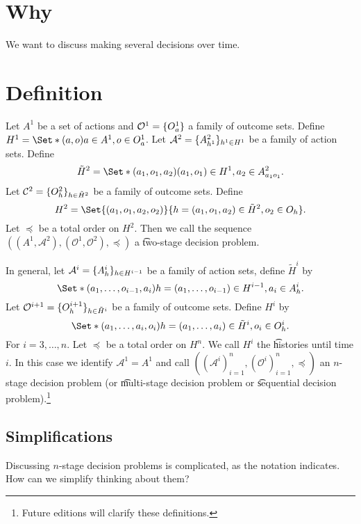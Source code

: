 

\section*{Why}

We want to discuss making several decisions over time.

\section*{Definition}

Let $A^{1}$ be a set of actions and $\mathcal{O}^1 = \{O^{1}_a\}$ a family of outcome sets.
Define $H^1 = \Set*{(a, o)}{a \in A^1, o \in O^{1}_a}$.
Let $\mathcal{A} ^2 = \{A^{2}_{h^1}\}_{h^1 \in H^1}$ be a family of action sets.
Define
    \[
\tilde{H}^{2} = \Set*{(a_1, o_1, a_2)}{(a_1, o_1) \in H^1, a_2 \in A^{2}_{a_1o_1}}.
    \]
Let $\mathcal{C}^2 = \{O^{2}_{h}\}_{h \in \tilde{H}^2}$ be a family of outcome sets.
Define
    \[
H^2 = \Set{(a_1, o_1, a_2, o_2)}{h = (a_1, o_1, a_2) \in \tilde{H}^2, o_2 \in O_{h}}.
    \]
Let $\preceq$ be a total order on $H^2$.
Then we call the sequence $((A^1, \mathcal{A} ^2), (\mathcal{O}^1, \mathcal{O}^2), \preceq)$ a \t{two-stage decision problem}.

In general, let $\mathcal{A} ^{i} = \{A^i_{h}\}_{h \in H^{i-1}}$ be a family of action sets, define $\tilde{H}^i$ by
    \[
\Set*{(a_1, \dots , o_{i-1}, a_i)}{h = (a_1, \dots , o_{i-1}) \in H^{i-1}, a_i \in A^i_{h}}.
    \]
Let $\mathcal{O}^{i+1} = \{O^{i+1}_{h}\}_{h \in \tilde{H}^{i}}$ be a family of outcome sets. Define $H^{i}$ by
    \[
\Set*{(a_1, \dots , a_i, o_i)}{h = (a_1, \dots , a_i) \in \tilde{H}^{i}, o_i \in O^i_{h}}.
    \]
For $i = 3, \dots , n$.
Let $\preceq$ be a total order on $H^{n}$.
We call $H^i$ the \t{histories until time $i$}.
In this case we identify $\mathcal{A} ^1 = A^1$ and call $((\mathcal{A} ^i)_{i = 1}^{n}, (\mathcal{O}^i)_{i = 1}^{n}, \preceq)$ an \t{$n$-stage decision problem} (or \t{multi-stage decision problem} or \t{sequential decision problem}).\footnote{Future editions will clarify these definitions.}

\subsection*{Simplifications}

Discussing $n$-stage decision problems is complicated, as the notation indicates.
How can we simplify thinking about them?

